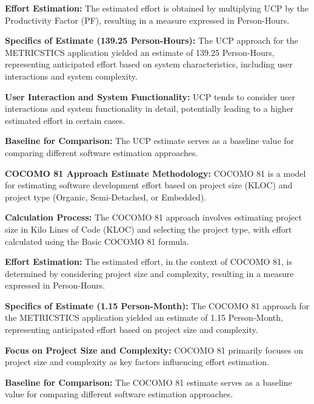 {{{{\textbf{Effort Estimation: }The estimated effort is obtained by multiplying UCP by the Productivity Factor (PF), resulting in a measure expressed in Person-Hours.\linebreak

\textbf{Specifics of Estimate (139.25 Person-Hours): }The UCP approach for the METRICSTICS application yielded an estimate of 139.25 Person-Hours, representing anticipated effort based on system characteristics, including user interactions and system complexity.\linebreak

\textbf{User Interaction and System Functionality: }UCP tends to consider user interactions and system functionality in detail, potentially leading to a higher estimated effort in certain cases.\linebreak

\textbf{Baseline for Comparison: }The UCP estimate serves as a baseline value for comparing different software estimation approaches.\linebreak


\textbf{COCOMO 81 Approach Estimate Methodology: }COCOMO 81 is a model for estimating software development effort based on project size (KLOC) and project type (Organic, Semi-Detached, or Embedded).\linebreak

\textbf{Calculation Process: }The COCOMO 81 approach involves estimating project size in Kilo Lines of Code (KLOC) and selecting the project type, with effort calculated using the Basic COCOMO 81 formula.\linebreak

\textbf{Effort Estimation: }The estimated effort, in the context of COCOMO 81, is determined by considering project size and complexity, resulting in a measure expressed in Person-Hours.\linebreak

\textbf{Specifics of Estimate (1.15 Person-Month): }The COCOMO 81 approach for the METRICSTICS application yielded an estimate of 1.15 Person-Month, representing anticipated effort based on project size and complexity.\linebreak

\textbf{Focus on Project Size and Complexity: }COCOMO 81 primarily focuses on project size and complexity as key factors influencing effort estimation.\linebreak

\textbf{Baseline for Comparison: }The COCOMO 81 estimate serves as a baseline value for comparing different software estimation approaches.\linebreak


}}}}
